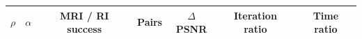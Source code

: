 \begin{tabular}{ccccccc}\hline
$\rho$ & $\alpha$ & MRI / RI success & Pairs & $\Delta$PSNR & Iteration ratio & Time ratio \\
\hline
\hline\end{tabular}
